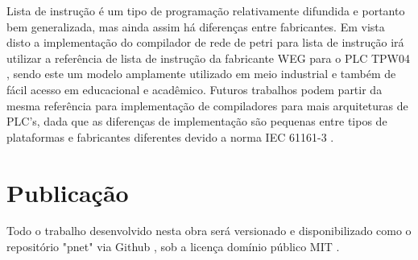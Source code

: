Lista de instrução é um tipo de programação relativamente difundida e portanto bem generalizada, mas ainda assim há diferenças entre fabricantes. Em vista disto a implementação do compilador de rede de petri para lista de instrução irá utilizar a referência de lista de instrução da fabricante WEG para o PLC TPW04 \cite{wegtpw04}, sendo este um modelo amplamente utilizado em meio industrial e também de fácil acesso em educacional e acadêmico. Futuros trabalhos podem partir da mesma referência para implementação de compiladores para mais arquiteturas de PLC's, dada que as diferenças de implementação são pequenas entre tipos de plataformas e fabricantes diferentes devido a norma IEC 61161-3 \cite{IEC611313}.  

\section{Publicação}

Todo o trabalho desenvolvido nesta obra será versionado e disponibilizado como o repositório "pnet" \cite{github-pnet} via Github \cite{github}, sob a licença domínio público MIT \cite{mit-license}.

